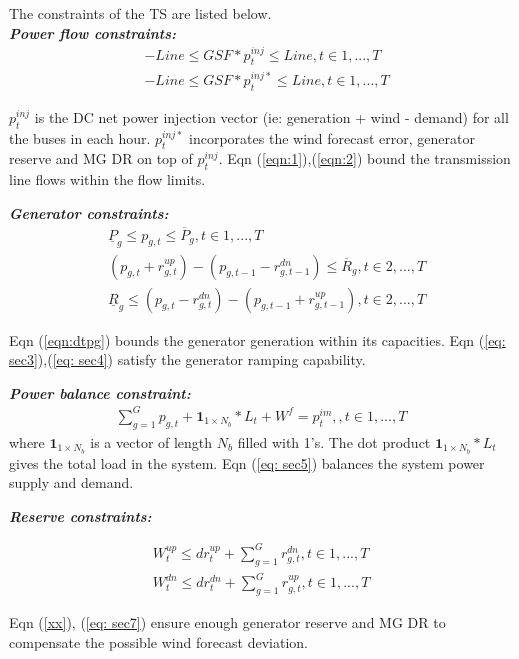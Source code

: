 The constraints of the TS are listed below. \\
\textbf{\emph{Power flow constraints:} }
\begin{align}
&-Line\leq GSF*p^{inj}_{t}\leq Line, t\in{1,...,T}\label{eqn:1}\\
&-Line\leq GSF*p^{inj*}_{t}\leq Line, t\in{1,...,T}\label{eqn:2}
\end{align}

$p^{inj}_{t}$ is the DC net power injection vector (ie: generation + wind - demand) for all the buses in each hour. $p^{inj*}_{t}$ incorporates the wind forecast error, generator reserve and MG DR on top of $p^{inj}_{t}$. Eqn (\ref{eqn:1}),(\ref{eqn:2})  bound the transmission line flows within the flow limits. 
 
\textbf{\emph{Generator constraints:} }
\begin{align}
& \underline{P}_g\leq p_{g,t}\leq  \overline{P}_g,  t\in{1,...,T}\label{eqn:dtpg}\\
& (p_{g,t} +r_{g,t}^{up})  - (p_{g,t-1}-  r_{g,t-1}^{dn}) \leq \overline{R}_g ,  t\in{2,...,T}\label{eq: sec3} \\
&  \underline{R}_{g} \leq (p_{g,t} -  r_{g,t}^{dn})  - (p_{g,t-1}+ r_{g,t-1}^{up}) , t\in{2,...,T}\label{eq: sec4} 
\end{align}

Eqn (\ref{eqn:dtpg}) bounds the generator generation within its capacities. Eqn (\ref{eq: sec3}),(\ref{eq: sec4}) satisfy the generator ramping capability. 

\textbf{\emph{Power balance constraint:} }
\begin{align}
\sum_{g=1}^{G} p_{g,t} + \mathbf{1}_{1\times N_b}*L_{t} + W^f = p^{im}_t, ,  t\in{1,...,T}\label{eq: sec5} 
\end{align}
where $\mathbf{1}_{1\times N_b}$ is a vector of length $N_b$ filled with 1's. The dot product $\mathbf{1}_{1\times N_b}*L_{t}$ gives the total load in the system. Eqn (\ref{eq: sec5}) balances the system power supply and demand. 

\textbf{\emph{Reserve constraints:} }

\begin{align}
W^{up}_t \leq dr^{up}_t + \sum_{g=1}^{G} r_{g,t}^{dn}, t\in{1,...,T} \label{xx} \\
W^{dn}_t \leq dr^{dn}_t + \sum_{g=1}^{G} r_{g,t}^{up}, t\in{1,...,T} \label{eq: sec7} 
\end{align}

Eqn (\ref{xx}), (\ref{eq: sec7}) ensure enough generator reserve and MG DR to compensate the possible wind forecast deviation. 


